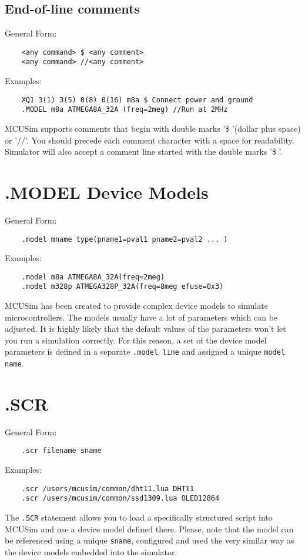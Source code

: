 \subsection{End-of-line comments}
\textnormal{General Form:}
\begin{lstlisting}
	<any command> $ <any comment>
	<any command> //<any comment>
\end{lstlisting}
\textnormal{Examples:}
\begin{lstlisting}
	XQ1 3(1) 3(5) 0(8) 0(16) m8a $ Connect power and ground
	.MODEL m8a ATMEGA8A_32A (freq=2meg) //Run at 2MHz
\end{lstlisting}
\textnormal{MCUSim supports comments that begin with double marks
'\$ '(dollar plus space) or '//'. You should precede each comment character
with a space for readability. Simulator will also accept a comment line
started with the double marks '\$ '.}

\section{.MODEL Device Models}
\textnormal{General Form:}
\begin{lstlisting}
	.model mname type(pname1=pval1 pname2=pval2 ... )
\end{lstlisting}
\textnormal{Examples:}
\begin{lstlisting}
	.model m8a ATMEGA8A_32A(freq=2meg)
	.model m328p ATMEGA328P_32A(freq=8meg efuse=0x3)
\end{lstlisting}
\textnormal{MCUSim has been created to provide complex device models to
simulate microcontrollers. The models usually have a lot of parameters
which can be adjusted. It is highly likely that the default values of
the parameters won't let you run a simulation correctly. For this reason,
a set of the device model parameters is defined in a separate
\lstinline|.model line| and assigned a unique \lstinline|model name|.}

\section{.SCR}
\textnormal{General Form:}
\begin{lstlisting}
	.scr filename sname
\end{lstlisting}
\textnormal{Examples:}
\begin{lstlisting}
	.scr /users/mcusim/common/dht11.lua DHT11
	.scr /users/mcusim/common/ssd1309.lua OLED12864
\end{lstlisting}
\textnormal{The \lstinline|.SCR| statement allows you to load a specifically
structured script into MCUSim and use a device model defined there. Please,
note that the model can be referenced using a unique \lstinline|sname|,
configured and used the very similar way as the device models embedded into
the simulator.}
